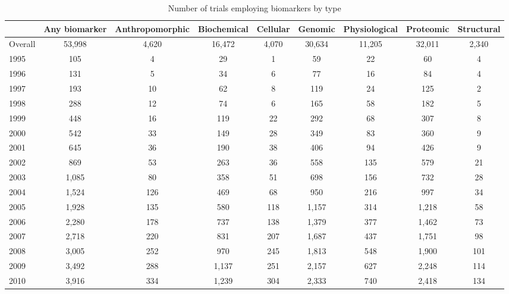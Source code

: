 \begin{table}[htbp]\centering
\caption{Number of trials employing biomarkers by type}
\begin{tabular}{l*{8}{c}}
\hline\hline
          &Any biomarker&Anthropomorphic&Biochemical& Cellular&  Genomic&Physiological&Proteomic&Structural\\
\hline
Overall   &   53,998&    4,620&   16,472&    4,070&   30,634&   11,205&   32,011&    2,340\\
1995      &      105&        4&       29&        1&       59&       22&       60&        4\\
1996      &      131&        5&       34&        6&       77&       16&       84&        4\\
1997      &      193&       10&       62&        8&      119&       24&      125&        2\\
1998      &      288&       12&       74&        6&      165&       58&      182&        5\\
1999      &      448&       16&      119&       22&      292&       68&      307&        8\\
2000      &      542&       33&      149&       28&      349&       83&      360&        9\\
2001      &      645&       36&      190&       38&      406&       94&      426&        9\\
2002      &      869&       53&      263&       36&      558&      135&      579&       21\\
2003      &    1,085&       80&      358&       51&      698&      156&      732&       28\\
2004      &    1,524&      126&      469&       68&      950&      216&      997&       34\\
2005      &    1,928&      135&      580&      118&    1,157&      314&    1,218&       58\\
2006      &    2,280&      178&      737&      138&    1,379&      377&    1,462&       73\\
2007      &    2,718&      220&      831&      207&    1,687&      437&    1,751&       98\\
2008      &    3,005&      252&      970&      245&    1,813&      548&    1,900&      101\\
2009      &    3,492&      288&    1,137&      251&    2,157&      627&    2,248&      114\\
2010      &    3,916&      334&    1,239&      304&    2,333&      740&    2,418&      134\\

\end{tabular}
\end{table}
